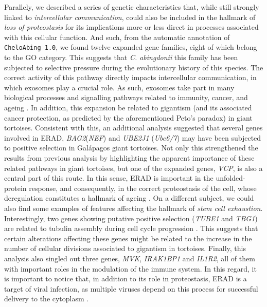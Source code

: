Parallely, we described a series of genetic characteristics that, while still strongly linked to \textit{intercellular communication}, could also be included in the hallmark of \textit{loss of proteostasis} for its implications more or less direct in processes associated with this cellular function.
And such, from the automatic annotation of \texttt{CheloAbing 1.0}, we found twelve expanded gene families, eight of which belong to the  GO category.
This suggests that \textit{C. abingdonii} this family has been subjected to selective pressure during the evolutionary history of this species.
The correct activity of this pathway directly impacts intercellular communication, in which exosomes play a crucial role.
As such, exosomes take part in many biological processes and signalling pathways related to immunity, cancer, and ageing \cite{Baixauli2014,Becker2016,Prattichizzo2017}.
In addition, this expansion be related to gigantism (and its associated cancer protection, as predicted by the aforementioned Peto's paradox) in giant tortoises.
Consistent with this, an additional analysis suggested that several genes involved in ERAD, \textit{BAG2}(\textit{NEF}) and \textit{UBE2J1} (\textit{Ubc6/7}) may have been subjected to positive selection in Gal\'{a}pagos giant tortoises.
Not only this strengthened the results from previous analysis by highlighting the apparent importance of these related pathways in giant tortoises, but one of the expanded genes, \textit{VCP}, is also a central part of this route.
In this sense, ERAD is important in the unfolded-protein response, and consequently, in the correct proteostasis of the cell, whose deregulation constitutes a hallmark of ageing \cite{Lopez-Otin2013,Scheper2015}.
On a different subject, we could also find some examples of features affecting the hallmark of \textit{stem cell exhaustion}.
Interestingly, two genes showing putative positive selection (\textit{TUBE1} and \textit{TBG1}) are related to tubulin assembly during cell cycle progression \cite{Chinen2015}.
This suggests that certain alterations affecting these genes might be related to the increase in the number of cellular divisions associated to gigantism in tortoises.
Finally, this analysis also singled out three genes, \textit{MVK}, \textit{IRAK1BP1} and \textit{IL1R2}, all of them with important roles in the modulation of the immune system.
In this regard, it is important to notice that, in addition to its role in proteostasis, ERAD is a target of viral infection, as multiple viruses depend on this process for successful delivery to the cytoplasm \cite{Morito2015}.

